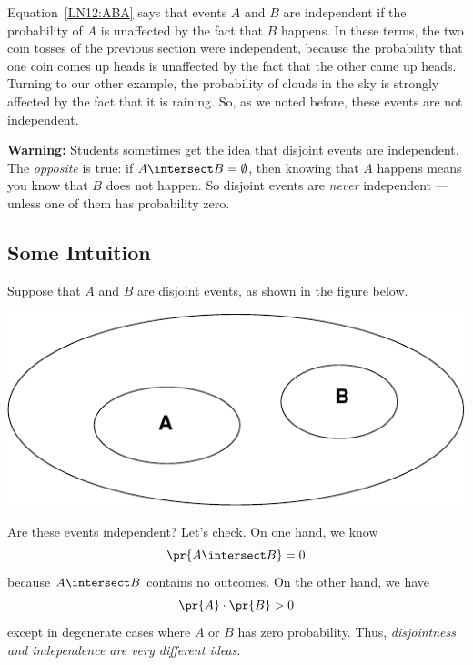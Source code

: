 Equation~\eqref{LN12:ABA} says that events $A$ and $B$ are independent if the
probability of $A$ is unaffected by the fact that $B$ happens.  In these
terms, the two coin tosses of the previous section were independent,
because the probability that one coin comes up heads is unaffected by the
fact that the other came up heads.  Turning to our other example, the
probability of clouds in the sky is strongly affected by the fact that it
is raining.  So, as we noted before, these events are not independent.

\textbf{Warning:} Students sometimes get the idea that disjoint events are
independent.  The \emph{opposite} is true: if $A \intersect B =
\emptyset$, then knowing that $A$ happens means you know that $B$ does not
happen.  So disjoint events are \emph{never} independent ---unless one of
them has probability zero.
\iffalse

\subsection{Some Intuition}

Suppose that $A$ and $B$ are disjoint events, as shown in the figure
below.
%
\begin{center}
\includegraphics{figures/disjoint-events}
\end{center}
%
Are these events independent?  Let's check.  On one hand, we know
%
\[
\pr{A \intersect B} = 0
\]
%
because $A \intersect B$ contains no outcomes.  On the other hand, we have
%
\[
\pr{A} \cdot \pr{B} > 0
\]
%
except in degenerate cases where $A$ or $B$ has zero probability.
Thus, \textit{disjointness and independence are very different ideas}.

